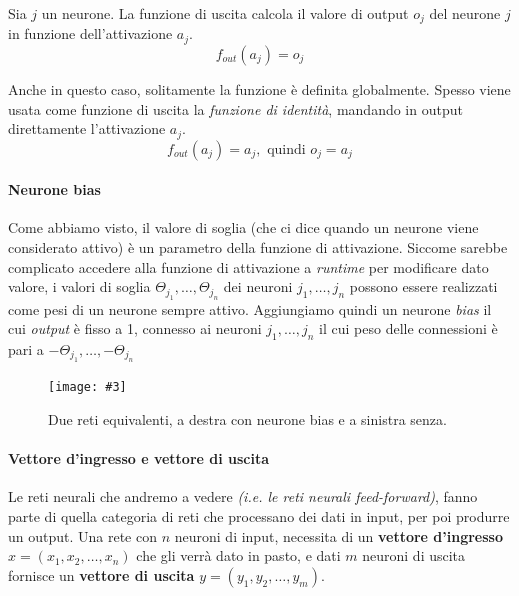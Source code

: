 \documentclass[12pt, twoside, letterpaper]{report}
\newcommand{\img}[4] {
	\begin{figure}
		\caption{#1}
		\centering
		\texttt{[image: \#3]}\\
		\label{#4}
	\end{figure}
}
\begin{document}
			 	Sia $j$ un neurone. La funzione di uscita calcola il valore di output $o_j$ del neurone $j$ in funzione dell'attivazione $a_j$. $$f_{out}(a_j) = o_j$$  %
			 	
			 	Anche in questo caso, solitamente la funzione è definita globalmente. Spesso viene usata come funzione di uscita la \textit{funzione di identità}, mandando in output direttamente l'attivazione $a_j$. $$f_{out}(a_j) = a_j, \text{ quindi } o_j = a_j$$
			 	
			 \paragraph{Neurone bias} Come abbiamo visto, il valore di soglia (che ci dice quando un neurone viene considerato attivo) è un parametro della funzione di attivazione. Siccome sarebbe complicato accedere alla funzione di attivazione a \textit{runtime} per modificare dato valore, i valori di soglia $\Theta_{j_1}, \dots, \Theta_{j_n}$ dei neuroni $j_1, \dots, j_n$ possono essere realizzati come pesi di un neurone sempre attivo. Aggiungiamo quindi un neurone \textit{bias} il cui \textit{output} è fisso a 1, connesso ai neuroni $j_1, \dots, j_n$ il cui peso delle connessioni è pari a $-\Theta_{j_1}, \dots, -\Theta_{j_n}$
			 
			 	\img{Due reti equivalenti, a destra con neurone bias e a sinistra senza.}{0.5}{bias-neuron.png}{bias}
			 	
			 \paragraph{Vettore d'ingresso e vettore di uscita} Le reti neurali che andremo a vedere \textit{(i.e. le reti neurali feed-forward)}, fanno parte di quella categoria di reti che processano dei dati in input, per poi produrre un output. Una rete con $n$ neuroni di input, necessita di un \textbf{vettore d'ingresso} $x = (x_1, x_2, \dots, x_n)$ che gli verrà dato in pasto, e dati $m$ neuroni di uscita fornisce un \textbf{vettore di uscita} $y = (y_1, y_2, \dots, y_m)$.  
			 
			 	 			 
\end{document}
